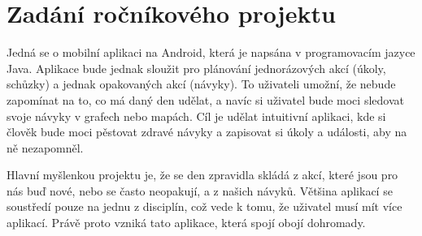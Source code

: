 \thispagestyle{empty}
\section*{Zadání ročníkového projektu}
\hspace{14pt} Jedná se o mobilní aplikaci na Android, která je napsána v programovacím jazyce Java. Aplikace bude jednak sloužit pro plánování jednorázových akcí (úkoly, schůzky) a jednak opakovaných akcí (návyky). To uživateli umožní, že nebude zapomínat na to, co má daný den udělat, a navíc si uživatel bude moci sledovat svoje návyky v grafech nebo mapách. Cíl je udělat intuitivní aplikaci, kde si člověk bude moci pěstovat zdravé návyky a zapisovat si úkoly a události, aby na ně nezapomněl.

Hlavní myšlenkou projektu je, že se den zpravidla skládá z akcí, které jsou pro nás buď nové, nebo se často neopakují, a z našich návyků. Většina aplikací se soustředí pouze na jednu z disciplín, což vede k tomu, že uživatel musí mít více aplikací. Právě proto vzniká tato aplikace, která spojí obojí dohromady.